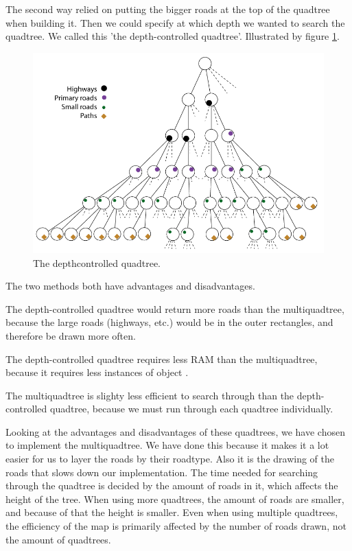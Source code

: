 The second way relied on putting the bigger roads at the top of the
quadtree when building it. Then we could specify at which depth we wanted to
search the quadtree. We called this 'the depth-controlled quadtree'. Illustrated
by figure \ref{IMPL-DCQ}.

\begin{figure}[h!]
\centering
\includegraphics[width=1\linewidth]{images/DepthcontrolledQuadtree.png}
\caption{The depthcontrolled quadtree.}
\label{IMPL-DCQ}
\end{figure}

The two methods both have advantages and disadvantages.

The depth-controlled quadtree would return more roads than the multiquadtree,
because the large roads (highways, etc.) would be in the outer rectangles, and
therefore be drawn more often.

The depth-controlled quadtree requires less RAM than the multiquadtree,
because it requires less instances of object .

The multiquadtree is slighty less efficient to search through than the
depth-controlled quadtree, because we must run through each quadtree
individually.

Looking at the advantages and disadvantages of these quadtrees, we have chosen
to implement the multiquadtree. We have done this because it makes it a lot
easier for us to layer the roads by their roadtype. Also it is the drawing of
the roads that slows down our implementation. The time needed for searching
through the quadtree is decided by the amount of roads in it, which affects the
height of the tree. When using more quadtrees, the amount of roads are smaller,
and because of that the height is smaller. Even when using multiple quadtrees,
the efficiency of the map is primarily affected by the number of roads drawn,
not the amount of quadtrees.

